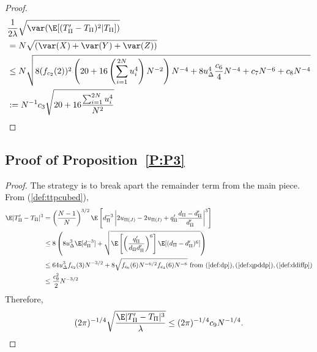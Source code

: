 \begin{proof}
  \begin{align*}
    &\frac{1}{2\lambda} \sqrt{\var (\E [(T_{\Pi}'-T_{\Pi})^2|T_{\Pi}])} \\
    &= N \sqrt{(\var(X) + \var(Y) + \var(Z))} \\
    &\leq N \sqrt{
      8(f_{c_2}(2))^2 \left ( 20 + 16 \left ( \sum_{i=1}^{2N} u_{i}^4 \right )N^{-2} \right ) N^{-4}
      + 8u_{\Delta}^4 \frac{c_6}{4} N^{-4}
      + c_7 N^{-6} + c_8 N^{-4}} \\
    &:= N^{-1} c_3\sqrt{20 + 16\frac{\sum_{i=1}^{2N} u_{i}^4}{N^2}} \\
  \end{align*}
\end{proof}

\subsection{Proof of Proposition~\ref{P:P3}}
\begin{proof}
  The strategy is to break apart the remainder term from the main piece.  From (\ref{def:ttpcubed}),
  \begin{align*}
    \E|T_{\Pi}'-T_{\Pi}|^3
    &= \left (\frac{N-1}{N}\right )^{3/2}
    \E \left [d_{\Pi}^{-3} \left |2u_{\Pi(J)}-2u_{\Pi(I)}+q_{\Pi}'\frac{d_{\Pi}-d_{\Pi}'}{d_{\Pi}'} \right |^3
    \right ] \\
    &\leq 8 \left (
      8 u_{\Delta}^3 \E [d_{\Pi}^{-3}] +
      \sqrt{\E \left [ \left ( \frac{q_{\Pi}'}{d_{\Pi}d_{\Pi}'} \right )^6 \right ]  \E
        [(d_{\Pi}-d_{\Pi}')^6]} \right ) \\
    &\leq 64 u_{\Delta}^3 f_{c_2}(3) N^{-3/2} +
    8 \sqrt{f_{c_6}(6) N^{-6/2} f_{c_4}(6) N^{-6}} \text{ from }
    (\ref{def:dp}),(\ref{def:qpddp}),(\ref{def:ddiffp}) \\
    &\leq \frac{c_9^2}{2} N^{-3/2}
  \end{align*}
  Therefore,
  \begin{equation*}
    (2\pi)^{-1/4}\sqrt{\frac{\E|T_{\Pi}'-T_{\Pi}|^3}{\lambda}} \leq
    (2\pi)^{-1/4} c_9 N^{-1/4}.
  \end{equation*}
\end{proof}

